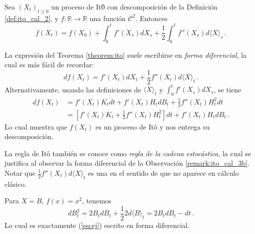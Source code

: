 \begin{theorem}
\label{theorem:ito}
Sea $(X_t)_{t \ge 0}$ un proceso de It\^{0} con descomposición de la Definición \ref{def:ito_cal_2}, y $f: \mathbb{R} \to  \mathbb{R}$ una función $\mathcal{C}^2$. Entonces 
\begin{equation*}
    \label{eq:ito_cal_3}
    f(X_t)  = f(X_0) + \int_{0}^{t} f'(X_s) dX_s +  \frac{1}{2}\int_{0}^{t} f''(X_s) d \langle X \rangle_s\,.
\end{equation*}
\end{theorem}

\begin{remark}
\label{remark:ito_dif}
La expresión del Teorema \ref{theorem:ito} suele escribirse en \textit{forma diferencial}, la cual es más fácil de 
recordar: 
\begin{equation*}
    \label{eq:ito_cal_3b}
    df(X_t) = f'(X_t)dX_t + \frac{1}{2} f''(X_t)d\langle X \rangle_t\,.
\end{equation*}
Alternativamente, usando las definiciones de $\langle X \rangle_t$  y $\int_{0}^{t} f'(X_s) dX_s$, se tiene 
\begin{align*}
    df(X_t) 
    &= f'(X_t) K_t dt + f'(X_t) H_t dB_t + \frac{1}{2} f''(X_t) H^2_t dt \\ 
    &= \left[ f'(X_t) K_t + \frac{1}{2} f''(X_t) H_t^2 \right] dt + f'(X_t) H_t dB_t \,.
\end{align*}
Lo cual muestra que $f(X_t)$ es un proceso de It\^{o} y nos entrega su descomposición.
\end{remark}
\begin{remark}
    La regla de It\^{o} también se conoce como \textit{regla de la cadena estocástica}, la cual se justifica al observar la forma diferencial de la Observación \ref{remark:ito_cal_3b}. Notar que $\frac{1}{2}f''(X_t) d\langle X \rangle_t$ es una  en el sentido de que no aparece en cálculo clásico. 
\end{remark}
\begin{example}
    Para $X = B$, $f(x) = x^2$, tenemos 
    \begin{equation*}
            dB_t^2 = 2B_t dB_t + \frac{1}{2} 2 d \langle B \rangle_t = 2B_t dB_t - dt\,.
    \end{equation*}
    Lo cual es exactamente (\ref{eq:ej}) escrito en forma diferencial. 
\end{example}

